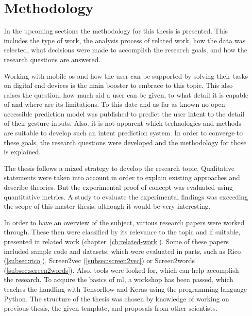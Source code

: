 \chapter{Methodology}

In the upcoming sections the methodology for this thesis is presented.
This includes the type of work,
the analysis process of related work,
how the data was selected,
what decisions were made to accomplish the research goals,
and how the research questions are answered.

Working with mobile \gls{os} and how the user can be supported by solving their tasks on digital end devices is the main booster to embrace to this topic.
This also raises the question, how much aid a user can be given, to what detail it is capable of and where are its limitations.
To this date and as far as known no open accessible prediction model was published to predict the user intent to the detail of their gesture inputs.
Also, it is not apparent which technologies and methods are suitable to develop such an intent prediction system.
In order to converge to these goals, the research questions were developed and the methodology for those is explained.

The thesis follows a mixed strategy to develop the research topic.
Qualitative statements were taken into account in order to explain existing approaches and describe theories.
But the experimental proof of concept was evaluated using quantitative metrics.
A study to evaluate the experimental findings was exceeding the scope of this master thesis, although it would be very interesting.

In order to have an overview of the subject, various research papers were worked through.
These then were classified by its relevance to the topic and if suitable, presented in related work (chapter~\ref{ch:related-work}).
Some of these papers included sample code and datasets, which were evaluated in parts, such as Rico (\ref{subsec:rico}), Screen2vec (\ref{subsec:screen2vec}) or Screen2words (\ref{subsec:screen2words}).
Also, tools were looked for, which can help accomplish the research.
To acquire the basics of \gls{ml}, a workshop has been passed, which teaches the handling with Tensorflow and Keras using the programming language Python.
The structure of the thesis was chosen by knowledge of working on previous thesis, the given template, and proposals from other scientists.

